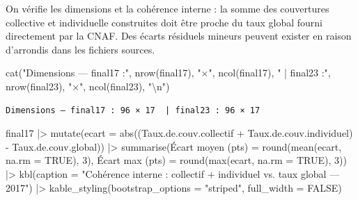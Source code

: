 \documentclass[
  letterpaper,
  DIV=11,
  numbers=noendperiod]{scrartcl}
\newenvironment{Shaded}{\begin{snugshade}}{\end{snugshade}}
\newcommand{\AttributeTok}[1]{\textcolor[rgb]{0.40,0.45,0.13}{#1}}
\newcommand{\ConstantTok}[1]{\textcolor[rgb]{0.56,0.35,0.01}{#1}}
\newcommand{\DecValTok}[1]{\textcolor[rgb]{0.68,0.00,0.00}{#1}}
\newcommand{\FunctionTok}[1]{\textcolor[rgb]{0.28,0.35,0.67}{#1}}
\newcommand{\NormalTok}[1]{\textcolor[rgb]{0.00,0.23,0.31}{#1}}
\newcommand{\OtherTok}[1]{\textcolor[rgb]{0.00,0.23,0.31}{#1}}
\newcommand{\SpecialCharTok}[1]{\textcolor[rgb]{0.37,0.37,0.37}{#1}}
\newcommand{\StringTok}[1]{\textcolor[rgb]{0.13,0.47,0.30}{#1}}
\begin{document}
On vérifie les dimensions et la cohérence interne : la somme des
couvertures collective et individuelle construites doit être proche du
taux global fourni directement par la CNAF. Des écarts résiduels mineurs
peuvent exister en raison d'arrondis dans les fichiers sources.

\begin{Shaded}
\begin{Highlighting}[]
\FunctionTok{cat}\NormalTok{(}\StringTok{"Dimensions — final17 :"}\NormalTok{, }\FunctionTok{nrow}\NormalTok{(final17), }\StringTok{"×"}\NormalTok{, }\FunctionTok{ncol}\NormalTok{(final17),}
    \StringTok{" | final23 :"}\NormalTok{, }\FunctionTok{nrow}\NormalTok{(final23), }\StringTok{"×"}\NormalTok{, }\FunctionTok{ncol}\NormalTok{(final23), }\StringTok{"}\SpecialCharTok{\textbackslash{}n}\StringTok{"}\NormalTok{)}
\end{Highlighting}
\end{Shaded}

\begin{verbatim}
Dimensions — final17 : 96 × 17  | final23 : 96 × 17 
\end{verbatim}

\begin{Shaded}
\begin{Highlighting}[]
\NormalTok{final17 }\SpecialCharTok{|\textgreater{}}
  \FunctionTok{mutate}\NormalTok{(}\AttributeTok{ecart =} \FunctionTok{abs}\NormalTok{((Taux.de.couv.collectif }\SpecialCharTok{+}\NormalTok{ Taux.de.couv.individuel) }\SpecialCharTok{{-}}
\NormalTok{                      Taux.de.couv.global)) }\SpecialCharTok{|\textgreater{}}
  \FunctionTok{summarise}\NormalTok{(}\StringTok{\textasciigrave{}}\AttributeTok{Écart moyen (pts)}\StringTok{\textasciigrave{}} \OtherTok{=} \FunctionTok{round}\NormalTok{(}\FunctionTok{mean}\NormalTok{(ecart, }\AttributeTok{na.rm =} \ConstantTok{TRUE}\NormalTok{), }\DecValTok{3}\NormalTok{),}
            \StringTok{\textasciigrave{}}\AttributeTok{Écart max (pts)}\StringTok{\textasciigrave{}}   \OtherTok{=} \FunctionTok{round}\NormalTok{(}\FunctionTok{max}\NormalTok{(ecart,  }\AttributeTok{na.rm =} \ConstantTok{TRUE}\NormalTok{), }\DecValTok{3}\NormalTok{)) }\SpecialCharTok{|\textgreater{}}
  \FunctionTok{kbl}\NormalTok{(}\AttributeTok{caption =} \StringTok{"Cohérence interne : collectif + individuel vs. taux global — 2017"}\NormalTok{) }\SpecialCharTok{|\textgreater{}}
  \FunctionTok{kable\_styling}\NormalTok{(}\AttributeTok{bootstrap\_options =} \StringTok{"striped"}\NormalTok{, }\AttributeTok{full\_width =} \ConstantTok{FALSE}\NormalTok{)}
\end{Highlighting}
\end{Shaded}
\end{document}
